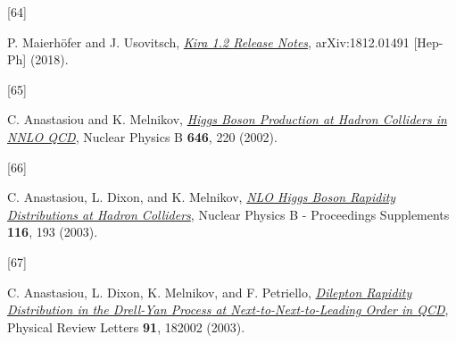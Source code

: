 \documentclass[
  11pt,
  a4paper,
  DIV=11,
  numbers=noendperiod,
  twoside]{scrreprt}
\newlength{\cslhangindent}
\newlength{\csllabelwidth}
\newlength{\cslentryspacingunit} %
\newenvironment{CSLReferences}[2] %
 {%
  \setlength{\parindent}{0pt}
  \ifodd #1
  \let\oldpar\par
  \def\par{\hangindent=\cslhangindent\oldpar}
  \fi
  \setlength{\parskip}{#2\cslentryspacingunit}
 }%
 {}
\newcommand{\CSLLeftMargin}[1]{\parbox[t]{\csllabelwidth}{#1}}
\newcommand{\CSLRightInline}[1]{\parbox[t]{\linewidth - \csllabelwidth}{#1}\break}
\DeclareRobustCommand{\[}{\begin{equation}}
\DeclareRobustCommand{\]}{\end{equation}}
\begin{document}
\begin{CSLReferences}{0}{0}
\leavevmode{}%
\CSLLeftMargin{{[}64{]} }%
\CSLRightInline{P. Maierhöfer and J. Usovitsch,
\emph{\href{https://arxiv.org/abs/1812.01491}{Kira 1.2 {Release
Notes}}}, arXiv:1812.01491 {[}Hep-Ph{]} (2018).}

\leavevmode{}%
\CSLLeftMargin{{[}65{]} }%
\CSLRightInline{C. Anastasiou and K. Melnikov,
\emph{\href{https://doi.org/10.1016/S0550-3213(02)00837-4}{Higgs Boson
Production at Hadron Colliders in {NNLO QCD}}}, Nuclear Physics B
\textbf{646}, 220 (2002).}

\leavevmode{}%
\CSLLeftMargin{{[}66{]} }%
\CSLRightInline{C. Anastasiou, L. Dixon, and K. Melnikov,
\emph{\href{https://doi.org/10.1016/S0920-5632(03)80168-8}{{NLO Higgs}
Boson Rapidity Distributions at Hadron Colliders}}, Nuclear Physics B -
Proceedings Supplements \textbf{116}, 193 (2003).}

\leavevmode{}%
\CSLLeftMargin{{[}67{]} }%
\CSLRightInline{C. Anastasiou, L. Dixon, K. Melnikov, and F. Petriello,
\emph{\href{https://doi.org/10.1103/PhysRevLett.91.182002}{Dilepton
{Rapidity Distribution} in the {Drell-Yan Process} at
{Next-to-Next-to-Leading Order} in {QCD}}}, Physical Review Letters
\textbf{91}, 182002 (2003).}

\end{CSLReferences}
\end{document}
